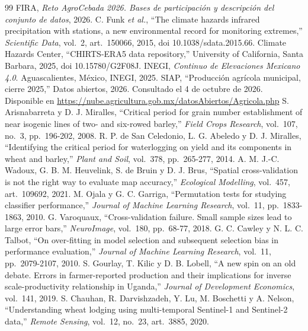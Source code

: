\begin{thebibliography}{99}
 FIRA, \emph{Reto AgroCebada 2026. Bases de participación y descripción del conjunto de datos},
  2026.
 C. Funk \emph{et al.}, ``The climate hazards infrared precipitation with stations, a new
  environmental record for monitoring extremes,'' \emph{Scientific Data}, vol.~2, art.~150066, 2015,
  doi 10.1038/sdata.2015.66.
 Climate Hazards Center, ``CHIRTS-ERA5 data repository,'' University of California, Santa
  Barbara, 2025, doi 10.15780/G2F08J.
 INEGI, \emph{Continuo de Elevaciones Mexicano 4.0}. Aguascalientes, México, INEGI, 2025.
 SIAP, ``Producción agrícola municipal, cierre 2025,'' Datos abiertos, 2026. Consultado el 4 de
  octubre de 2026. Disponible en \url{https://nube.agricultura.gob.mx/datosAbiertos/Agricola.php}
 S. Arisnabarreta y D. J. Miralles, ``Critical period for grain number establishment of
  near isogenic lines of two- and six-rowed barley,'' \emph{Field Crops Research}, vol.~107, no.~3, pp.~196-202,
  2008.
 R. P. de San Celedonio, L. G. Abeledo y D. J. Miralles, ``Identifying the critical
  period for waterlogging on yield and its components in wheat and barley,'' \emph{Plant and Soil}, vol.~378,
  pp.~265-277, 2014.
 A. M. J.-C. Wadoux, G. B. M. Heuvelink, S. de Bruin y D. J. Brus, ``Spatial cross-validation
  is not the right way to evaluate map accuracy,'' \emph{Ecological Modelling}, vol.~457, art.~109692, 2021.
 M. Ojala y G. C. Garriga, ``Permutation tests for studying classifier performance,''
  \emph{Journal of Machine Learning Research}, vol.~11, pp.~1833-1863, 2010.
 G. Varoquaux, ``Cross-validation failure. Small sample sizes lead to large error bars,''
  \emph{NeuroImage}, vol.~180, pp.~68-77, 2018.
 G. C. Cawley y N. L. C. Talbot, ``On over-fitting in model selection and subsequent selection
  bias in performance evaluation,'' \emph{Journal of Machine Learning Research}, vol.~11, pp.~2079-2107, 2010.
 S. Gourlay, T. Kilic y D. B. Lobell, ``A new spin on an old debate. Errors in farmer-reported
  production and their implications for inverse scale-productivity relationship in Uganda,'' \emph{Journal of
  Development Economics}, vol.~141, 2019.
 S. Chauhan, R. Darvishzadeh, Y. Lu, M. Boschetti y A. Nelson, ``Understanding wheat lodging
  using multi-temporal Sentinel-1 and Sentinel-2 data,'' \emph{Remote Sensing}, vol.~12, no.~23, art.~3885, 2020.
\end{thebibliography}
